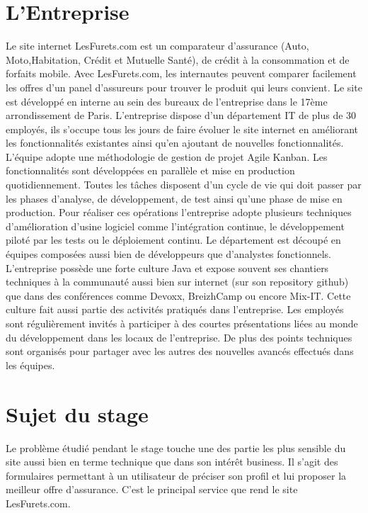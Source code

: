 \documentclass[12pt,a4paper,oldfontcommands]{article}
\begin{document}
\section{L'Entreprise}
Le site internet LesFurets.com est un comparateur d'assurance (Auto, Moto,Habitation, Crédit et Mutuelle Santé), de crédit à la consommation et de forfaits mobile. Avec LesFurets.com, les internautes peuvent comparer facilement les offres d’un panel d’assureurs pour trouver le produit qui leurs convient. Le site est développé en interne au sein des bureaux de l'entreprise dans le 17ème arrondissement de Paris. 
L'entreprise dispose d'un département IT de plus de 30 employés, ils s'occupe tous les jours de faire évoluer le site internet en améliorant les fonctionnalités existantes ainsi qu'en ajoutant de nouvelles fonctionnalités. L'équipe adopte une méthodologie de gestion de projet Agile Kanban. Les fonctionnalités sont développées en parallèle et mise en production quotidiennement. Toutes les tâches disposent d'un cycle de vie qui doit passer par les phases d'analyse, de développement, de test ainsi qu'une phase de mise en production.
Pour réaliser ces opérations l'entreprise adopte plusieurs techniques d'amélioration d'usine logiciel comme l'intégration continue, le développement piloté par les tests ou le déploiement continu. Le département est découpé en équipes composées aussi bien de développeurs que d'analystes fonctionnels.
L'entreprise possède une forte culture Java et expose souvent ses chantiers techniques à la communauté aussi bien sur internet (sur son repository github) que dans des conférences comme Devoxx, BreizhCamp ou encore Mix-IT. Cette culture fait aussi partie des activités pratiqués dans l'entreprise. Les employés sont régulièrement invités à participer à des courtes présentations liées au monde du développement dans les locaux de l'entreprise. De plus des points techniques sont organisés pour partager avec les autres des nouvelles avancés effectués dans les équipes. 

\section{Sujet du stage}
Le problème étudié pendant le stage touche une des partie les plus sensible du site aussi bien en terme technique que dans son intérêt business. Il s'agit des formulaires permettant à un utilisateur de préciser son profil et lui proposer la meilleur offre d'assurance. C'est le principal service que rend le site LesFurets.com.
\end{document}
